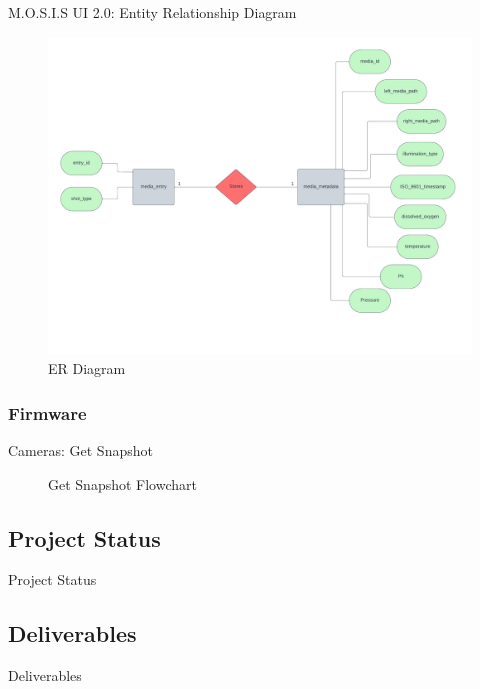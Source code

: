 \documentclass[14pt, aspectratio=169]{beamer}
\begin{document}
\begin{frame}{M.O.S.I.S UI 2.0: Entity Relationship Diagram}
	\begin{figure}
		\includegraphics[page=1,height=0.7\textheight]{../../Progress_Report_Document/Appendix/Design_Documentation/ER_Diagram/Figures/ER_Diagram_MOSIS.pdf}
		\caption{ER Diagram}
	\end{figure}
\end{frame}
\subsubsection{Firmware}
\begin{frame}{Cameras: Get Snapshot}
	\begin{figure}[H]
		\begin{center}
		\end{center}
		\caption{Get Snapshot Flowchart}
	\end{figure}
\end{frame}
\subsection{Project Status}
\begin{frame}{Project Status}

\end{frame}
\subsection{Deliverables}
\begin{frame}{Deliverables}

\end{frame}
\end{document}
